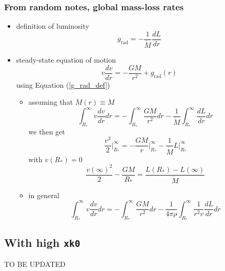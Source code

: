 \documentclass[../main/main.tex]{subfiles}
\begin{document}
\subsubsection{From random notes, global mass-loss rates}
\begin{itemize}
\item definition of luminosity 
\begin{equation}
g_{\text{rad}} = - \frac{1}{\dot{M}} \frac{dL}{dr}
\label{g_rad_def}
\end{equation}

\item steady-state equation of motion
\begin{equation}
v \frac{dv}{dr} = - \frac{GM}{r^2} + g_{\text{rad}}(r)
\end{equation}
using Equation (\ref{g_rad_def})


\begin{itemize}
\item assuming that $\dot{M}(r) \equiv \dot{M}$
\begin{equation}
\int_{R_*}^{\infty} v \frac{dv}{dr} dr = - \int_{R_*}^{\infty} \frac{GM}{r^2}dr - \frac{1}{\dot{M}} \int_{R_*}^{\infty} \frac{dL}{dr}dr
\end{equation}
we then get
\begin{equation}
\frac{v^2}{2} \Big|_{R_*}^{\infty} = - \frac{GM}{r}\Big|_{R_*}^{\infty}  - \frac{1}{\dot{M}} L \Big|_{R_*}^{\infty}
\end{equation}
with $v(R_*) = 0$ 
\begin{equation}
\frac{v(\infty)^2}{2} - \frac{GM}{R_*} = \frac{L(R_*) - L(\infty)}{\dot{M}}
\end{equation}

\item in general
\begin{equation}
\int_{R_*}^{\infty} v \frac{dv}{dr} dr = - \int_{R_*}^{\infty} \frac{GM}{r^2}dr - \frac{1}{4 \pi \rho} \int_{R_*}^{\infty} \frac{1}{r^2v}\frac{dL}{dr}dr
\end{equation}


\end{itemize}

\end{itemize}



\newpage
\subsection{With high \texttt{xk0}}
TO BE UPDATED
\end{document}
